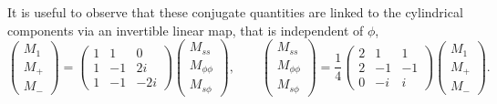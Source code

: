 It is useful to observe that these conjugate quantities are linked to the cylindrical components via an invertible linear map, that is independent of $\phi$,
\begin{equation}\label{eqn:linmap-conjugate}
    \begin{pmatrix} M_1 \\ M_+ \\ M_- \end{pmatrix} = 
    \begin{pmatrix}
        1 & 1 & 0 \\
        1 & -1 & 2i \\ 
        1 & -1 & - 2i
    \end{pmatrix}
    \begin{pmatrix} M_{ss} \\ M_{\phi\phi} \\ M_{s\phi} \end{pmatrix},\qquad 
    \begin{pmatrix} M_{ss} \\ M_{\phi\phi} \\ M_{s\phi} \end{pmatrix} = \frac{1}{4}
    \begin{pmatrix}
        2 & 1 & 1 \\
        2 & -1 & -1 \\ 
        0 & -i & i
    \end{pmatrix}
    \begin{pmatrix} M_1 \\ M_+ \\ M_- \end{pmatrix}.
\end{equation}
\medskip

